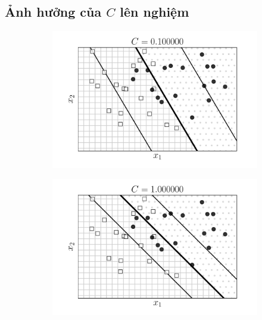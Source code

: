  
 
 
\subsection{Ảnh hưởng của $C$ lên nghiệm }

\begin{figure}[t]
    \begin{subfigure}{0.45\textwidth}
        \includegraphics[width=0.95\linewidth]{ebookML_src/src/softmargin_svm/ssvm5_01.pdf}
    \end{subfigure}
    \begin{subfigure}{0.45\textwidth}
        \includegraphics[width=0.95\linewidth]{ebookML_src/src/softmargin_svm/ssvm5_1.pdf}
    \end{subfigure}
    

\end{figure}
